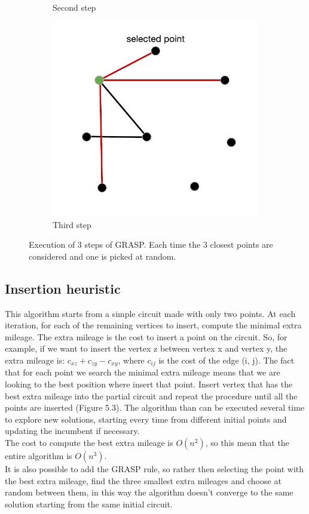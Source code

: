 \begin{figure}[h!]
\begin{subfigure}[b]{0.49\linewidth}
    \caption{Second step}
  \end{subfigure}
  \begin{subfigure}[b]{0.49\linewidth}
    \includegraphics[width=\linewidth]{media/grasp_fase3.pdf}
    \caption{Third step}
  \end{subfigure}
  \caption{Execution of 3 steps of GRASP. Each time the 3 closest points are considered and one is picked at random.}
\end{figure}

\subsection{Insertion heuristic}
This algorithm starts from a simple circuit made with only two points. At each iteration, for each of the remaining vertices to insert, compute the minimal extra mileage. The extra mileage is the cost to insert a point on the circuit. So, for example, if we want to insert the vertex z between vertex x and vertex y, the extra mileage is: $c_{xz} + c_{zy} - c_{xy}$, where $c_{ij}$ is the cost of the edge (i, j). The fact that for each point we search the minimal extra mileage means that we are looking to the best position where insert that point. Insert vertex that has the best extra mileage into the partial circuit and repeat the procedure until all the points are inserted (Figure 5.3). The algorithm than can be executed several time to explore new solutions, starting every time from different initial points and updating the incumbent if necessary. \\
The cost to compute the best extra mileage is $O(n^2)$, so this mean that the entire algorithm is $O(n^3)$.\\
It is also possible to add the GRASP rule, so rather then selecting the point with the best extra mileage, find the three smallest extra mileages and choose at random between them, in this way the algorithm doesn't converge to the same solution starting from the same initial circuit. \\

